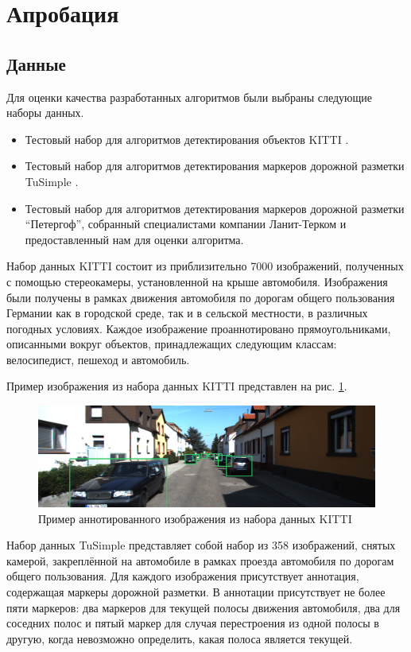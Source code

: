 \documentclass[aps,%
14pt,%
final,%
oneside,
onecolumn,%
musixtex, %
superscriptaddress,%
centertags]{extarticle} %
\begin{document}
\newpage
\section{Апробация}

\subsection{Данные}

Для оценки качества разработанных алгоритмов были выбраны следующие наборы данных.
\begin{itemize}
\item Тестовый набор для алгоритмов детектирования объектов KITTI \cite{Geiger2012CVPR}.
\item Тестовый набор для алгоритмов детектирования маркеров дорожной разметки TuSimple \cite{tusimple}.
\item Тестовый набор для алгоритмов детектирования маркеров дорожной разметки ``Петергоф'', собранный специалистами компании Ланит-Терком и предоставленный нам для оценки алгоритма.
\end{itemize}

Набор данных KITTI состоит из приблизительно 7000 изображений, полученных с помощью стереокамеры, установленной на крыше автомобиля. Изображения были получены в рамках движения автомобиля по дорогам общего пользования Германии как в городской среде, так и в сельской местности, в различных погодных условиях. Каждое изображение проаннотировано прямоугольниками, описанными вокруг объектов, принадлежащих следующим классам: велосипедист, пешеход и автомобиль.

Пример изображения из набора данных KITTI представлен на рис. \ref{fig:ex_kitti}.

\begin{figure}[htp]
\centering
\includegraphics[width=\textwidth]{kitti_ex.png}
\caption{Пример аннотированного изображения из набора данных KITTI}
\label{fig:ex_kitti}
\end{figure}

Набор данных TuSimple представляет собой набор из 358 изображений, снятых камерой, закреплённой на автомобиле в рамках проезда автомобиля по дорогам общего пользования. Для каждого изображения присутствует аннотация, содержащая маркеры дорожной разметки. В аннотации присутствует не более пяти маркеров: два маркеров для текущей полосы движения автомобиля, два для соседних полос и пятый маркер для случая перестроения из одной полосы в другую, когда невозможно определить, какая полоса является текущей.
\end{document}
